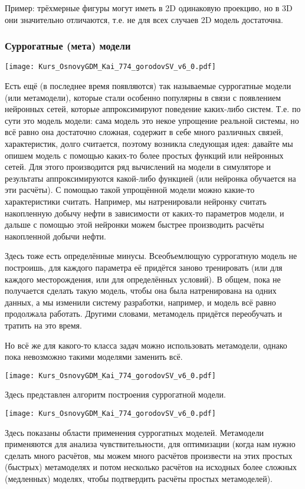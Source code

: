 \documentclass[main.tex]{subfiles}
\begin{document}
Пример: трёхмерные фигуры могут иметь в 2D одинаковую проекцию, но в 3D они значительно отличаются, т.е. не для всех случаев 2D модель достаточна.

\subsubsection{Суррогатные (мета) модели}

\texttt{[image: Kurs\_OsnovyGDM\_Kai\_774\_gorodovSV\_v6\_0.pdf]}

Есть ещё (в последнее время появляются) так называемые суррогатные модели (или метамодели), которые стали особенно популярны в связи с появлением нейронных сетей, которые аппроксимируют поведение каких-либо систем.
Т.е. по сути это модель модели: сама модель это некое упрощение реальной системы, но всё равно она достаточно сложная, содержит в себе много различных связей, характеристик, долго считается, поэтому возникла следующая идея: давайте мы опишем модель с помощью каких-то более простых функций или нейронных сетей.
Для этого производится ряд вычислений на модели в симуляторе и результаты аппроксимируются какой-либо функцией (или нейронка обучается на эти расчёты). 
С помощью такой упрощённой модели можно какие-то характеристики считать.
Например, мы натренировали нейронку считать накопленную добычу нефти в зависимости от каких-то параметров модели, и дальше с помощью этой нейронки можем быстрее производить расчёты накопленной добычи нефти.

Здесь тоже есть определённые минусы. Всеобъемлющую суррогатную модель не построишь, для каждого параметра её придётся заново тренировать (или для каждого месторождения, или для определённых условий).
В общем, пока не получается сделать такую модель, чтобы она была натренирована на одних данных, а мы изменили систему разработки, например, и модель всё равно продолжала работать.
Другими словами, метамодель придётся переобучать и тратить на это время.

Но всё же для какого-то класса задач можно использовать метамодели, однако пока невозможно такими моделями заменить всё.

\texttt{[image: Kurs\_OsnovyGDM\_Kai\_774\_gorodovSV\_v6\_0.pdf]}

Здесь представлен алгоритм построения суррогатной модели.

\texttt{[image: Kurs\_OsnovyGDM\_Kai\_774\_gorodovSV\_v6\_0.pdf]}

Здесь показаны области применения суррогатных моделей.
Метамодели применяются для анализа чувствительности, для оптимизации (когда нам нужно сделать много расчётов, мы можем много расчётов произвести на этих простых (быстрых) метамоделях и потом несколько расчётов на исходных более сложных (медленных) моделях, чтобы подтвердить расчёты простых метамоделей).
\end{document}
